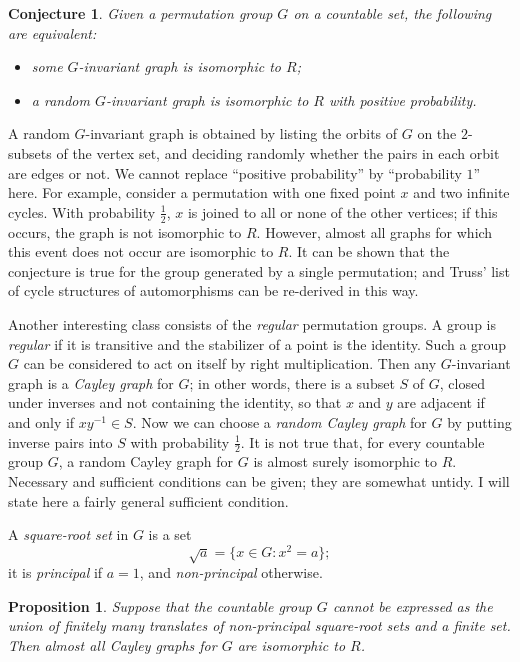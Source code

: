 \documentclass{book}
\newtheorem{proposition}{Proposition}
\newtheorem{conjecture}{Conjecture}
\begin{document}
\begin{conjecture}\label{ch32:conj8.1} 
Given a permutation group $G$ on a countable set, the following are equivalent:
\begin{itemize}
\item[(a)] some $G$-invariant graph is isomorphic to $R$;
\item[(b)] a random $G$-invariant graph is isomorphic to $R$ with positive probability.
\end{itemize}
\end{conjecture}

A random $G$-invariant graph is obtained by listing the orbits of
$G$ on the $2$-subsets of the vertex set, and deciding randomly
whether the pairs in each orbit are edges or not. We cannot replace
``positive probability'' by ``probability $1$'' here. For example,
consider a permutation with one fixed point $x$ and two infinite
cycles. With probability $\frac{1}{2}$, $x$ is joined to all or none
of the other vertices; if this occurs, the graph is not isomorphic
to $R$. However, almost all graphs for which this event does not
occur are isomorphic to $R$. It can be shown that the conjecture is
true for the group generated by a single permutation; and Truss'
list of cycle structures of automorphisms can be re-derived in this
way.

Another interesting class consists of the \emph{regular}
permutation groups. A group is \emph{regular} if it is transitive
and the stabilizer of a point is the identity. Such a group $G$ can
be considered to act on itself by right multiplication. Then any
$G$-invariant graph is a \emph{Cayley graph} for $G$; in other
words, there is a subset $S$ of $G$, closed under inverses and not
containing the identity, so that $x$ and $y$ are adjacent if and
only if $xy^{-1}\in S$. Now we can choose a \emph{random Cayley
graph} for $G$ by putting inverse pairs into $S$ with probability
$\frac{1}{2}$. It is not true that, for every countable group $G$, a
random Cayley graph for $G$ is almost surely isomorphic to $R$.
Necessary and sufficient conditions can be given; they are somewhat
untidy. I will state here a fairly general sufficient condition.

A \emph{square-root set} in $G$ is a set
\[
\sqrt{a} = \{x \in G : x^2=a\};
\]
it is \emph{principal} if $a = 1$, and \emph{non-principal}
otherwise.

\begin{proposition}\label{ch32:prop8.3} 
Suppose that the countable group $G$ cannot be
expressed as the union of finitely many translates of non-principal
square-root sets and a finite set. Then almost all Cayley graphs for
$G$ are isomorphic to $R$.
\end{proposition}
\end{document}
